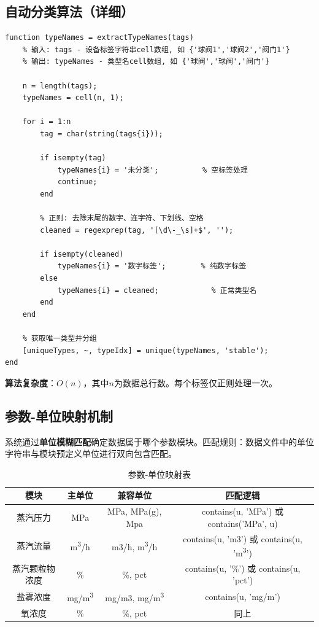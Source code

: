 \documentclass[12pt,a3paper]{ctexart}
\begin{document}
\subsection{自动分类算法（详细）}

\begin{lstlisting}[caption={标签分类核心算法 (MATLAB伪代码)}, label={lst:classify}]
function typeNames = extractTypeNames(tags)
    % 输入: tags - 设备标签字符串cell数组, 如 {'球阀1','球阀2','阀门1'}
    % 输出: typeNames - 类型名cell数组, 如 {'球阀','球阀','阀门'}

    n = length(tags);
    typeNames = cell(n, 1);

    for i = 1:n
        tag = char(string(tags{i}));

        if isempty(tag)
            typeNames{i} = '未分类';          % 空标签处理
            continue;
        end

        % 正则: 去除末尾的数字、连字符、下划线、空格
        cleaned = regexprep(tag, '[\d\-_\s]+$', '');

        if isempty(cleaned)
            typeNames{i} = '数字标签';        % 纯数字标签
        else
            typeNames{i} = cleaned;            % 正常类型名
        end
    end

    % 获取唯一类型并分组
    [uniqueTypes, ~, typeIdx] = unique(typeNames, 'stable');
end
\end{lstlisting}

\textbf{算法复杂度}：$O(n)$，其中$n$为数据总行数。每个标签仅正则处理一次。

\subsection{参数-单位映射机制}

系统通过\textbf{单位模糊匹配}确定数据属于哪个参数模块。匹配规则：数据文件中的单位字符串与模块预定义单位进行双向包含匹配。

\begin{table}[H]
\centering
\caption{参数-单位映射表}
\begin{tabular}{c|c|c|c}
\toprule
\textbf{模块} & \textbf{主单位} & \textbf{兼容单位} & \textbf{匹配逻辑} \\
\midrule
蒸汽压力 & MPa & MPa, MPa(g), Mpa & contains(u, 'MPa') 或 contains('MPa', u) \\
蒸汽流量 & m\textsuperscript{3}/h & m3/h, m\textsuperscript{3}/h & contains(u, 'm3') 或 contains(u, 'm\textsuperscript{3}') \\
蒸汽颗粒物浓度 & \% & \%, pct & contains(u, '\%') 或 contains(u, 'pct') \\
盐雾浓度 & mg/m\textsuperscript{3} & mg/m3, mg/m\textsuperscript{3} & contains(u, 'mg/m') \\
氧浓度 & \% & \%, pct & 同上 \\
\bottomrule
\end{tabular}
\end{table}
\end{document}
